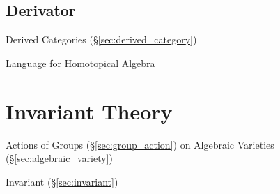\subsection{Derivator}\label{sec:derivator}

Derived Categories (\S\ref{sec:derived_category})

Language for Homotopical Algebra



\section{Invariant Theory}\label{sec:invariant_theory}

Actions of Groups (\S\ref{sec:group_action}) on Algebraic Varieties
(\S\ref{sec:algebraic_variety})

Invariant (\S\ref{sec:invariant})
